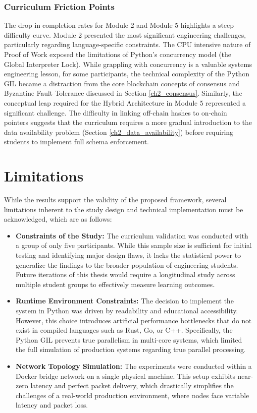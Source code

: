 \subsubsection{Curriculum Friction Points}
The drop in completion rates for Module 2 and Module 5 highlights a steep difficulty curve. Module 2 presented the most significant engineering challenges, particularly regarding language-specific constraints. The CPU intensive nature of Proof of Work exposed the limitations of Python's concurrency model (the Global Interpreter Lock). While grappling with concurrency is a valuable systems engineering lesson, for some participants, the technical complexity of the Python GIL became a distraction from the core blockchain concepts of consensus and Byzantine Fault Tolerance discussed in Section \ref{ch2_consensus}. Similarly, the conceptual leap required for the Hybrid Architecture in Module 5 represented a significant challenge. The difficulty in linking off-chain hashes to on-chain pointers suggests that the curriculum requires a more gradual introduction to the data availability problem (Section \ref{ch2_data_availability}) before requiring students to implement full schema enforcement.

\section{Limitations} \label{sec:limitations}
While the results support the validity of the proposed framework, several limitations inherent to the study design and technical implementation must be acknowledged, which are as follows:

\begin{itemize}
    \item \textbf{Constraints of the Study:} The curriculum validation was conducted with a group of only five participants. While this sample size is sufficient for initial testing and identifying major design flaws, it lacks the statistical power to generalize the findings to the broader population of engineering students. Future iterations of this thesis would require a longitudinal study across multiple student groups to effectively measure learning outcomes.
    
    \item \textbf{Runtime Environment Constraints:} The decision to implement the system in Python was driven by readability and educational accessibility. However, this choice introduces artificial performance bottlenecks that do not exist in compiled languages such as Rust, Go, or C++. Specifically, the Python GIL prevents true parallelism in multi-core systems, which limited the full simulation of production systems regarding true parallel processing.
    
    \item \textbf{Network Topology Simulation:} The experiments were conducted within a Docker bridge network on a single physical machine. This setup exhibits near-zero latency and perfect packet delivery, which drastically simplifies the challenges of a real-world production environment, where nodes face variable latency and packet loss.
\end{itemize}


